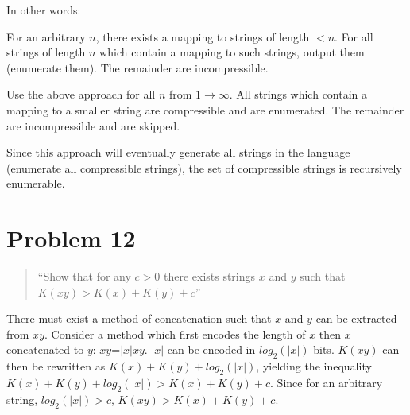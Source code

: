 \documentclass{article}
\begin{document}
\bigskip
In other words:

For an arbitrary $n$, there exists a mapping to strings of length $< n$.  For all strings of length $n$ which contain a mapping to such strings, output them (enumerate them).  The remainder are incompressible.  

Use the above approach for all $n$ from $1\rightarrow\infty$.  All strings which contain a mapping to a smaller string are compressible and are enumerated.  The remainder are incompressible and are skipped.  

Since this approach will eventually generate all strings in the language (enumerate all compressible strings), the set of compressible strings is recursively enumerable.

\section{Problem 12}
\begin{quote}
``Show that for any $c>0$ there exists strings $x$ and $y$ such that $K(xy) > K(x) + K(y) + c$''
\end{quote}

There must exist a method of concatenation such that $x$ and $y$ can be extracted from $xy$. Consider a method which first encodes the length of $x$ then $x$ concatenated to $y$: $xy$=$|x|xy$.  $|x|$ can be encoded in $log_{2}(|x|)$ bits.  $K(xy)$ can then be rewritten as $K(x)+K(y)+log_{2}(|x|)$, yielding the inequality $K(x)+K(y)+log_{2}(|x|) > K(x) + K(y) + c$.  Since for an arbitrary string, $log_{2}(|x|) > c$, $K(xy) > K(x) + K(y) + c$.
\end{document}
